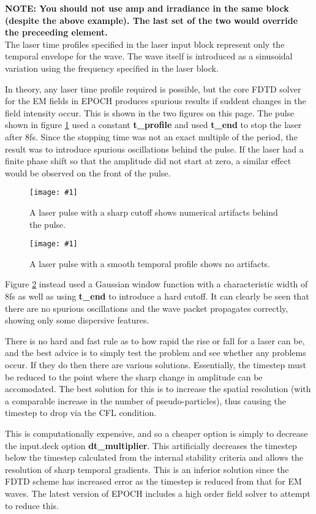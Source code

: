 \documentclass[12pt]{article}
\newcommand{\emphtext}{\color{warwickdark} \fontfamily{phv}\selectfont\Large\bf}
\newcommand{\inlineemph}[1]{{\color{warwicklight} \bf{#1}}}
\newcommand{\nEPOCH}{{\color{warwickdark}\fontfamily{phv}\selectfont EPOCH}}
\newcommand{\EPOCH}{{\nEPOCH} }
\newcommand{\captionedimage}[3]
  {{\begin{figure}\centering \texttt{[image: \#1]} \caption{#3} \label{#2}
    \end{figure}}}
\begin{document}
{\emphtext NOTE: You should not use amp and irradiance in the same block
(despite the above example). The last set of the two would override the
preceeding element.}\\

The laser time profiles specified in the laser input block represent only the
temporal envelope for the wave. The wave itself is introduced as a sinusoidal
variation using the frequency specified in the laser block.

In theory, any laser time profile required is possible, but the core FDTD
solver for the EM fields in \EPOCH produces spurious results if suddent changes
in the field intensity occur. This is shown in the two figures on this
page. The pulse shown in figure \ref{badpulse} used a constant
\inlineemph{t\_profile} and used \inlineemph{t\_end} to stop the laser after
8fs. Since
the stopping time was not an exact multiple of the period, the result was to
introduce spurious oscillations behind the pulse. If the laser had a finite
phase shift so that the amplitude did not start at zero, a similar effect would
be observed on the front of the pulse.

\captionedimage{./images/pulse2.eps}{badpulse}{A laser pulse with a sharp
cutoff shows numerical artifacts behind the pulse.}
\captionedimage{./images/pulse1.eps}{smoothpulse}{A laser pulse with a smooth
temporal profile shows no artifacts.}

Figure \ref{smoothpulse} instead used a Gaussian window function with a
characteristic width of 8fs as well as using \inlineemph{t\_end} to introduce
a hard cutoff. It can clearly be seen that there are no spurious oscillations
and the wave packet propagates correctly, showing only some dispersive
features.

There is no hard and fast rule as to how rapid the rise or fall for a laser can
be, and the best advice is to simply test the problem and see whether any
problems occur. If they do then there are various solutions. Essentially, the
timestep must be reduced to the point where the sharp change in amplitude can
be accomodated. The best solution for this is to increase the spatial
resolution (with a comparable increase in the number of pseudo-particles), thus
causing the timestep to drop via the CFL condition.

This is computationally expensive, and so a cheaper option is simply to
decrease the input.deck option \inlineemph{dt\_multiplier}. This artificially
decreases the timestep below the timestep calculated from the internal
stability criteria and allows the resolution of sharp temporal gradients. This
is an inferior solution since the FDTD scheme has increased error as the
timestep is reduced from that for EM waves. The latest version of EPOCH
includes a high order field solver to attempt to reduce this.
\end{document}
